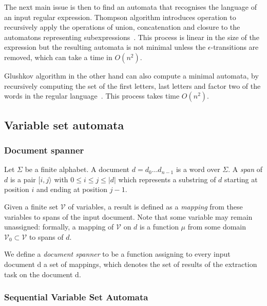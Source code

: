 \documentclass[12px]{article}
\begin{document}
        \vspace{0.5cm}

        The next main issue is then to find an automata that recognises the
        language of an input regular expression. Thompson algorithm introduces
        operation to recursively apply the operations of union, concatenation
        and closure to the automatons representing
        subexpressions~\cite{thompson1968programming}. This process is linear
        in the size of the expression but the resulting automata is not
        minimal unless the $\epsilon$-transitions are removed, which can take a
        time in $O(n^2)$.

        Glushkov algorithm in the other hand can also compute a minimal
        automata, by recursively computing the set of the first letters, last
        letters and factor two of the words in the regular
        language~\cite{glushkov1961abstract}. This
        process takes time $O(n^2)$.

    \subsection{Variable set automata}

      \subsubsection*{Document spanner}

        Let $\Sigma$ be a finite alphabet. A document $d = d_0 \dots d_{n−1}$
        is a word over $\Sigma$. A \textit{span} of $d$ is a pair $[i,
        j\rangle$ with $0 \leq i \leq j \leq |d|$ which represents a substring
        of $d$ starting at position $i$ and ending at position $j - 1$.

        Given a finite set $\mathcal{V}$ of variables, a result is defined as a
        \textit{mapping} from these variables to spans of the input document.
        Note that some variable may remain unassigned: formally, a mapping of
        $\mathcal{V}$ on $d$ is a function $\mu$ from some domain
        $\mathcal{V}_0 \subset \mathcal{V}$ to spans of $d$.

        We define a \textit{document spanner} to be a function assigning to
        every input document d a set of mappings, which denotes the set of
        results of the extraction task on the document d.

      \subsubsection*{Sequential Variable Set Automata}
\end{document}
